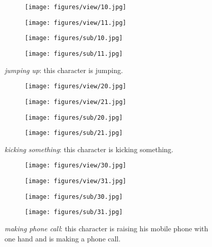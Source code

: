 \documentclass[runningheads]{llncs}
\begin{document}
\begin{figure}[h!]
  \centering
  \begin{subfigure}{0.99\textwidth}
    \texttt{[image: figures/view/10.jpg]}
\end{subfigure}
  \begin{subfigure}{0.99\textwidth}
    \texttt{[image: figures/view/11.jpg]}
\end{subfigure}
  \begin{subfigure}{0.99\textwidth}
    \texttt{[image: figures/sub/10.jpg]}
\end{subfigure}
  \begin{subfigure}{0.99\textwidth}
    \texttt{[image: figures/sub/11.jpg]}
\end{subfigure}
  \caption{\textit{jumping up}: this character is jumping.}
  \label{fig:ntu_1}
\end{figure}

\begin{figure}[h!]
  \centering
  \begin{subfigure}{0.99\textwidth}
    \texttt{[image: figures/view/20.jpg]}
\end{subfigure}
  \begin{subfigure}{0.99\textwidth}
    \texttt{[image: figures/view/21.jpg]}
\end{subfigure}
  \begin{subfigure}{0.99\textwidth}
    \texttt{[image: figures/sub/20.jpg]}
\end{subfigure}
  \begin{subfigure}{0.99\textwidth}
    \texttt{[image: figures/sub/21.jpg]}
\end{subfigure}
  \caption{\textit{kicking something}: this character is kicking something.}
  \label{fig:ntu_2}
\end{figure}





\begin{figure}[h!]
  \centering
  \begin{subfigure}{0.99\textwidth}
    \texttt{[image: figures/view/30.jpg]}
\end{subfigure}
  \begin{subfigure}{0.99\textwidth}
    \texttt{[image: figures/view/31.jpg]}
\end{subfigure}
  \begin{subfigure}{0.99\textwidth}
    \texttt{[image: figures/sub/30.jpg]}
\end{subfigure}
  \begin{subfigure}{0.99\textwidth}
    \texttt{[image: figures/sub/31.jpg]}
\end{subfigure}
  \caption{\textit{making phone call}: this character is raising his mobile phone with one hand and is making a phone call.}
  \label{fig:ntu_3}
\end{figure}
\end{document}
